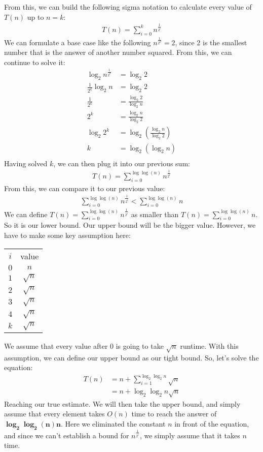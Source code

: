 \documentclass[
	12pt
]{fphw}
\begin{document}
\begin{enumerate}
	From this, we can build the following sigma notation to calculate every value of $T(n)$ up to $n = k$:
	\begin{align*}
		T(n) = \sum_{i=0}^{k} n^{\frac{1}{2^i}}
	\end{align*}
	We can formulate a base case like the following $n^{\frac{1}{2^k}} = 2$, since 2 is the smallest number that is the answer of another number squared. From this, we can continue to solve it:
	\begin{align*}
		\log_2 n^{\frac{1}{2^k}} &= \log_2 2\\
		\frac{1}{2^k} \log_2 n &= \log_2 2\\
		\frac{1}{2^k} &= \frac{\log_2 2}{\log_2 n}\\
		2^k &= \frac{\log_2 n}{\log_2 2}\\
		\log_2 2^k &= \log_2(\frac{\log_2 n}{\log_2 2})\\
		k &= \log_2(\log_2 n)\\
	\end{align*}
	Having solved $k$, we can then plug it into our previous sum:
	\begin{align*}
		T(n) = \sum_{i = 0}^{\log \log(n)} n^{\frac{1}{2^i}}
	\end{align*}
	From this, we can compare it to our previous value:
	\begin{align*}
		\sum_{i = 0}^{\log \log(n)} n^{\frac{1}{2^i}} < \sum_{i = 0}^{\log \log(n)} n
	\end{align*}
	We can define $T(n) = \sum_{i = 0}^{\log \log(n)} n^{\frac{1}{2^i}}$ as smaller than $T(n) = \sum_{i = 0}^{\log \log(n)} n$. So it is our lower bound. Our upper bound will be the bigger value. However, we have to make some key assumption here:
	\begin{center}
		\begin{tabular}{c | c}
			$i$ & value \\
			$0$ & $n$ \\
			$1$ & $\sqrt{n}$ \\
			$2$ & $\sqrt{n}$ \\
			$3$ & $\sqrt{n}$ \\
			$4$ & $\sqrt{n}$ \\
			$k$ & $\sqrt{n}$ \\
		\end{tabular}
	\end{center}
	We assume that every value after $0$ is going to take $\sqrt{n}$ runtime. With this assumption, we can define our upper bound as our tight bound. So, let's solve the equation:
	\begin{align*}
		T(n) &= n + \sum_{i = 1}^{\log_2 \log_2 n} \sqrt{n}\\
		&= n + \log_2 \log_2 n \sqrt{n}
	\end{align*}
	Reaching our true estimate. We will then take the upper bound, and simply assume that every element takes $O(n)$ time to reach the answer of $\boxed{\mathbf{\log_2 \log_2 (n) n}}$. Here we eliminated the constant $n$ in front of the equation, and since we can't establish a bound for $n^{\frac{1}{2^i}}$, we simply assume that it takes $n$ time.
\end{enumerate}
\end{document}
